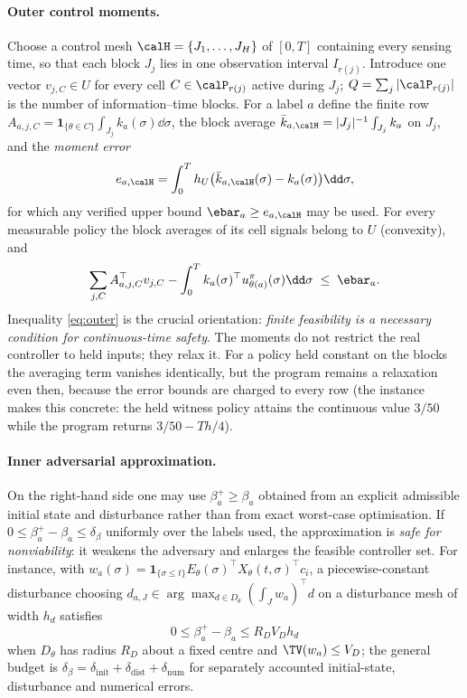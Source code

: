 \paragraph{Outer control moments.}
Choose a control mesh $\calH=\{J_1,\dots,J_H\}$ of $[0,T]$ containing every sensing time, so that each block $J_j$ lies in one observation interval $I_{r(j)}$. Introduce one vector $v_{j,C}\in U$ for every cell $C\in\calP_{r(j)}$ active during $J_j$; $Q=\sum_j|\calP_{r(j)}|$ is the number of information--time blocks. For a label $a$ define the finite row $A_{a,j,C}=\mathbf 1_{\{\theta\in C\}}\int_{J_j}k_a(\sigma)\dd\sigma$, the block average $\bar k_{a,\calH}=|J_j|^{-1}\int_{J_j}k_a$ on $J_j$, and the \emph{moment error}
\begin{equation}\label{eq:momerr}
e_{a,\calH}=\int_0^T h_U\bigl(\bar k_{a,\calH}(\sigma)-k_a(\sigma)\bigr)\dd\sigma,
\end{equation}
for which any verified upper bound $\ebar_a\ge e_{a,\calH}$ may be used. For every measurable policy the block averages of its cell signals belong to $U$ (convexity), and
\begin{equation}\label{eq:outer}
\sum_{j,C}A_{a,j,C}^\top v_{j,C}-\int_0^T k_a(\sigma)^\top u^\pi_{\theta(a)}(\sigma)\dd\sigma\;\le\;\ebar_a .
\end{equation}
Inequality \eqref{eq:outer} is the crucial orientation: \emph{finite feasibility is a necessary condition for continuous-time safety}. The moments do not restrict the real controller to held inputs; they relax it. For a policy held constant on the blocks the averaging term vanishes identically, but the program remains a relaxation even then, because the error bounds are charged to every row (the instance makes this concrete: the held witness policy attains the continuous value $3/50$ while the program returns $3/50-Th/4$).

\paragraph{Inner adversarial approximation.}
On the right-hand side one may use $\beta^+_a\ge\beta_a$ obtained from an explicit admissible initial state and disturbance rather than from exact worst-case optimisation. If $0\le\beta^+_a-\beta_a\le\delta_\beta$ uniformly over the labels used, the approximation is \emph{safe for nonviability}: it weakens the adversary and enlarges the feasible controller set. For instance, with $w_a(\sigma)=\mathbf 1_{\{\sigma\le t\}}E_\theta(\sigma)^\top X_\theta(t,\sigma)^\top c_i$, a piecewise-constant disturbance choosing $d_{a,J}\in\arg\max_{d\in D_\theta}(\int_Jw_a)^\top d$ on a disturbance mesh of width $h_d$ satisfies
\begin{equation}\label{eq:distbound}
0\le\beta^+_a-\beta_a\le R_DV_Dh_d
\end{equation}
when $D_\theta$ has radius $R_D$ about a fixed centre and $\TV(w_a)\le V_D$; the general budget is $\delta_\beta=\delta_{\mathrm{init}}+\delta_{\mathrm{dist}}+\delta_{\mathrm{num}}$ for separately accounted initial-state, disturbance and numerical errors.

